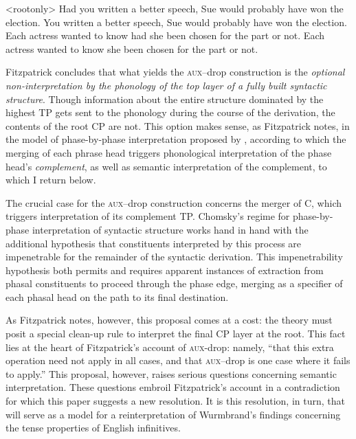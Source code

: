 \documentclass[output=paper]{langscibook}
\begin{document}
\pex<rootonly>
\a Had you written a better speech, Sue would probably have won the election.
\a *You written a better speech,  Sue would probably have won the election.
\xe
{}
\a Each actress wanted to know had she been chosen for the part or not.
\a \ljudge{*}Each actress wanted to know she been chosen for the part or not.
\xe

Fitzpatrick concludes that what yields the \textsc{aux}--drop construction is the \textit{optional non-interpretation by the phonology of the top layer of a fully built syntactic structure}. Though information about the entire structure dominated by the highest TP gets sent to the phonology during the course of the derivation, the contents of the root CP are not. This option makes sense, as Fitzpatrick notes, in the model of phase-by-phase interpretation proposed by \citet{Chomsky2001}, according to which the merging of each phrase head triggers phonological interpretation of the phase head's \textit{complement}, as well as semantic interpretation of the complement, to which I return below. 

The crucial case for the \textsc{aux}--drop construction concerns the merger of C, which triggers interpretation of its complement TP. Chomsky's \citeyearpar{Chomsky2001} regime for phase-by-phase interpretation of syntactic structure works hand in hand with the additional hypothesis that constituents interpreted by this process are impenetrable for the remainder of the syntactic derivation. This impenetrability hypothesis both permits and requires apparent instances of extraction from phasal constituents to proceed through the phase edge, merging as a specifier of each phasal head on the path to its final destination. 

As Fitzpatrick notes, however, this proposal comes at a cost: the theory must posit a special clean-up rule to interpret the final CP layer at the root. This fact lies at the heart of Fitzpatrick's account of \textsc{aux-}drop: namely, “that this extra operation need not apply in all cases, and that \textsc{aux}--drop is one case where it fails to apply.” This proposal, however, raises serious questions concerning semantic interpretation. These questions embroil Fitzpatrick's account in a contradiction for which this paper suggests a new resolution. It is this resolution, in turn, that will serve as a model for a reinterpretation of Wurmbrand's \citeyearpar{Wurmbrand:2014aa} findings concerning the tense properties of English infinitives. 
\end{document}
